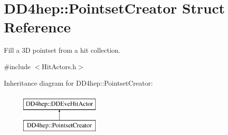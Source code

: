 \hypertarget{struct_d_d4hep_1_1_pointset_creator}{}\section{D\+D4hep\+:\+:Pointset\+Creator Struct Reference}
\label{struct_d_d4hep_1_1_pointset_creator}


Fill a 3D pointset from a hit collection.  




{\ttfamily \#include $<$Hit\+Actors.\+h$>$}

Inheritance diagram for D\+D4hep\+:\+:Pointset\+Creator\+:\begin{figure}[H]
\begin{center}
\leavevmode
\includegraphics[height=2.000000cm]{struct_d_d4hep_1_1_pointset_creator}
\end{center}
\end{figure}
